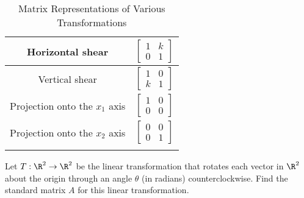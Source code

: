 \begin{longtable}{|c|c|}
  \midrule
  Horizontal shear & $\begin{bmatrix} 1 & k \\ 0 & 1 \end{bmatrix}$ \\
  \midrule
  Vertical shear & $\begin{bmatrix} 1 & 0 \\ k & 1 \end{bmatrix}$ \\
  \midrule
  Projection onto the $x_1$ axis & $\begin{bmatrix} 1 & 0 \\ 0 & 0 \end{bmatrix}$ \\
  \midrule
  Projection onto the $x_2$ axis & $\begin{bmatrix} 0 & 0 \\ 0 & 1 \end{bmatrix}$ \\
  \bottomrule
  \caption{Matrix Representations of Various Transformations}
  \label{fig:matrix_representations_of_various_transformations}
\end{longtable}


\begin{question}
  \label{qst:standard_matrix_2}

  Let $T : \R^2 \to \R^2$ be the linear transformation that rotates each vector
  in $\R^2$ about the origin through an angle $\theta$ (in radians)
  counterclockwise. Find the standard matrix $A$ for this linear transformation.
\end{question}

